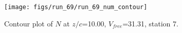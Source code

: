 \begin{figure}[H]
\centering
\texttt{[image: figs/run\_69/run\_69\_num\_contour]}
\caption{Contour plot of $N$ at $z/c$=10.00, $V_{free}$=31.31, station 7.}
\label{fig:run_69_num_contour}
\end{figure}


